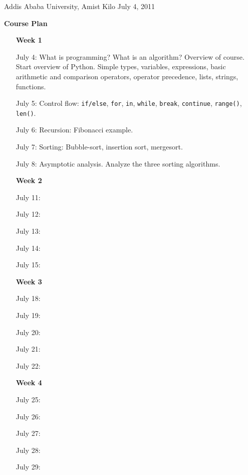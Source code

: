 \documentclass[11pt]{article}
\newlength{\toppush}
\newcommand{\htitle}[2]{\noindent\vspace*{-\toppush}\newline\parbox{6.5in}
 {\large Addis Ababa University, Amist Kilo \hfill #1\newline
\hspace*{\fill}{\bf Algorithms and Programming for High Schoolers} \hspace*{\fill} \newline
\mbox{}\hrulefill\mbox{}}\vspace*{1ex}\mbox{}\newline
\begin{center}{\Large\bf #2}\end{center}}
\begin{document}
\htitle{July 4, 2011}{Course Plan}

\begin{itemize}
\item[] \begin{center}{\Large \bf{Week 1}}\end{center}
\item[July 4:] What is programming? 
What is an algorithm? Overview of course.
Start overview of Python. Simple types, variables, expressions,
  basic arithmetic and comparison operators, operator precedence,
  lists, strings, functions.
\item[July 5:] Control flow: \texttt{if/else}, 
  \texttt{for}, \texttt{in}, \texttt{while}, \texttt{break}, \texttt{continue},
  \texttt{range()}, \texttt{len()}.
\item[July 6:] Recursion: Fibonacci example.
\item[July 7:] Sorting: Bubble-sort, insertion sort, mergesort.
\item[July 8:] Asymptotic analysis.  Analyze the three sorting
  algorithms.
\item[] \begin{center}{\Large \bf{Week 2}}\end{center}
\item[July 11:]
\item[July 12:]
\item[July 13:]
\item[July 14:]
\item[July 15:]
\item[] \begin{center}{\Large \bf{Week 3}}\end{center}
\item[July 18:]
\item[July 19:]
\item[July 20:]
\item[July 21:]
\item[July 22:]
\item[] \begin{center}{\Large \bf{Week 4}}\end{center}
\item[July 25:]
\item[July 26:]
\item[July 27:]
\item[July 28:]
\item[July 29:]
\end{itemize}
\end{document}
